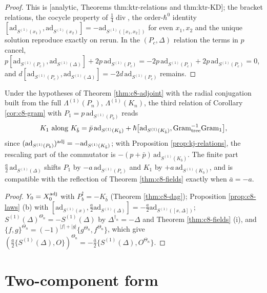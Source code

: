 \begin{proof}
This is [analytic, Theorems thm:ktr-relations and thm:ktr-KD]; the bracket relations, the cocycle property of $\tfrac14\operatorname{div}$, the order-$\hbar^0$ identity $[\mathrm{ad}_{S^{(1)}(x_1)},\mathrm{ad}_{S^{(1)}(x_2)}]=-\mathrm{ad}_{S^{(1)}([x_1,x_2])}$ for even $x_1,x_2$ and the unique solution reproduce exactly on rerun. In the $(P_c,\Delta)$ relation the terms in $p$ cancel, $p[\mathrm{ad}_{S^{(1)}(P_c)},\mathrm{ad}_{S^{(1)}(\Delta)}]+2p\,\mathrm{ad}_{S^{(1)}(P_c)}=-2p\,\mathrm{ad}_{S^{(1)}(P_c)}+2p\,\mathrm{ad}_{S^{(1)}(P_c)}=0$, and $d[\mathrm{ad}_{S^{(1)}(P_c)},\mathrm{ad}_{S^{(1)}(\Delta)}]=-2d\,\mathrm{ad}_{S^{(1)}(P_c)}$ remains.
\end{proof}

\begin{corollary}[$K=P^\dagger$ as a cross-check]
\label{cor:kj-gram}
Under the hypotheses of Theorem \ref{thm:c8-adjoint} with the radial conjugation built from the full $\Lambda^{(1)}(P_n)$, $\Lambda^{(1)}(K_n)$, the third relation of Corollary \ref{cor:c8-gram} with $P_1=p\,\mathrm{ad}_{S^{(1)}(P_b)}$ reads
\[
K_1\ \text{along}\ K_{\bar b}=\bar p\,\mathrm{ad}_{S^{(1)}(K_{\bar b})}+\hbar\big[\mathrm{ad}_{S^{(1)}(K_{\bar b})},\mathrm{Gram}_{\rm tree}^{-1}\mathrm{Gram}_{\rm 1}\big],
\]
since $(\mathrm{ad}_{S^{(1)}(P_b)})^{\rm adj}=-\mathrm{ad}_{S^{(1)}(K_{\bar b})}$; with Proposition \ref{prop:kj-relations}, the rescaling part of the commutator is $-(p+\bar p)\,\mathrm{ad}_{S^{(1)}(K_{\bar b})}$. The finite part $\tfrac a2\,\mathrm{ad}_{S^{(1)}(\Delta)}$ shifts $P_1$ by $-a\,\mathrm{ad}_{S^{(1)}(P_c)}$ and $K_1$ by $+a\,\mathrm{ad}_{S^{(1)}(K_b)}$, and is compatible with the reflection of Theorem \ref{thm:c8-fields} exactly when $\bar a=-a$.
\end{corollary}

\begin{proof}
$Y_0=X_0^{\rm adj}$ with $P_b^\dagger=-K_{\bar b}$ (Theorem \ref{thm:c8-dag}); Proposition \ref{prop:c8-laws} (b) with $[\mathrm{ad}_{S^{(1)}(x)},\tfrac a2\mathrm{ad}_{S^{(1)}(\Delta)}]=-\tfrac a2\mathrm{ad}_{S^{(1)}([x,\Delta])}$; $S^{(1)}(\Delta)^{\Theta_n}=-S^{(1)}(\Delta)$ by $\Delta^{\dagger_n}=-\Delta$ and Theorem \ref{thm:c8-fields} (i), and $\{f,g\}^{\Theta_n}=(-1)^{|f|+|g|}\{g^{\Theta_n},f^{\Theta_n}\}$, which give $(\tfrac a2\{S^{(1)}(\Delta),O\})^{\Theta_n}=-\tfrac{\bar a}{2}\{S^{(1)}(\Delta),O^{\Theta_n}\}$.
\end{proof}

\section{Two-component form}

